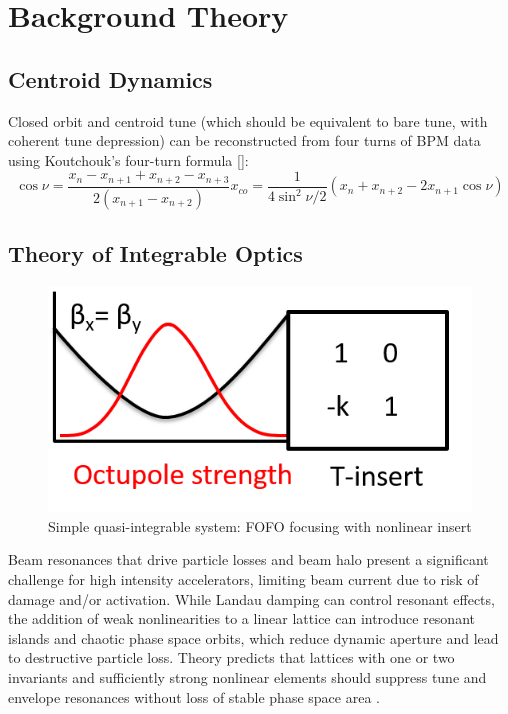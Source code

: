 
\renewcommand{\thechapter}{2}

\chapter{Background Theory}

\section{Centroid Dynamics}




Closed orbit and centroid tune (which should be equivalent to bare tune, with coherent tune depression) can be reconstructed from four turns of BPM data using Koutchouk's four-turn formula [\cite{Koutchouk}]:
\begin{subequations}
\begin{equation}
\label{}
\cos \nu = \frac{x_n - x_{n+1} + x_{n+2} - x_{n+3}}{2(x_{n+1}-x_{n+2})}
\end{equation}
\begin{equation}
\label{}
x_{co} = \frac{1}{4\sin ^2 \nu/2}(x_n+x_{n+2}-2x_{n+1}\cos \nu)
\end{equation}
\end{subequations}

\section{Theory of Integrable Optics}


\begin{figure}
\centering
\includegraphics[width=.3\textwidth]{2.figures/toy_model.png}
\caption{Simple quasi-integrable system: FOFO focusing with nonlinear insert }
\label{fig:toymodel}
\end{figure}


Beam resonances that drive particle losses and beam halo present a significant challenge for high intensity accelerators, limiting beam current due to risk of damage and/or activation. While Landau damping can control resonant effects, the addition of weak nonlinearities to a linear lattice can introduce resonant islands and chaotic phase space orbits, which reduce dynamic aperture and lead to destructive particle loss. Theory predicts that lattices with one or two invariants and sufficiently strong nonlinear elements should suppress tune and envelope resonances without loss of stable phase space area \cite{Danilov2010}. 

